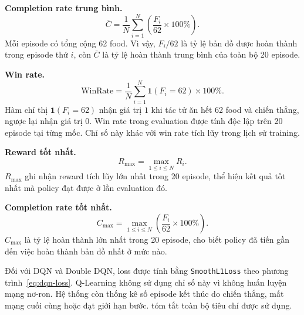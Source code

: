 \noindent\textbf{Completion rate trung bình.}
\begin{equation}
    \overline{C}=\frac{1}{N}\sum_{i=1}^{N}\left(\frac{F_i}{62}\times100\%\right).
    \label{eq:average-completion}
\end{equation}
Mỗi episode có tổng cộng 62 food. Vì vậy, $F_i/62$ là tỷ lệ bản đồ được hoàn thành trong episode thứ $i$, còn $\overline{C}$ là tỷ lệ hoàn thành trung bình của toàn bộ 20 episode.

\noindent\textbf{Win rate.}
\begin{equation}
    \mathrm{WinRate}=\frac{1}{N}\sum_{i=1}^{N}\mathbf{1}(F_i=62)\times100\%.
    \label{eq:evaluation-win-rate}
\end{equation}
Hàm chỉ thị $\mathbf{1}(F_i=62)$ nhận giá trị $1$ khi tác tử ăn hết 62 food và chiến thắng, ngược lại nhận giá trị $0$. Win rate trong evaluation được tính độc lập trên 20 episode tại từng mốc. Chỉ số này khác với win rate tích lũy trong lịch sử training.

\noindent\textbf{Reward tốt nhất.}
\begin{equation}
    R_{\max}=\max_{1\leq i\leq N}R_i.
    \label{eq:best-reward}
\end{equation}
$R_{\max}$ ghi nhận reward tích lũy lớn nhất trong 20 episode, thể hiện kết quả tốt nhất mà policy đạt được ở lần evaluation đó.

\noindent\textbf{Completion rate tốt nhất.}
\begin{equation}
    C_{\max}=\max_{1\leq i\leq N}\left(\frac{F_i}{62}\times100\%\right).
    \label{eq:best-completion}
\end{equation}
$C_{\max}$ là tỷ lệ hoàn thành lớn nhất trong 20 episode, cho biết policy đã tiến gần đến việc hoàn thành bản đồ nhất ở mức nào.

Đối với DQN và Double DQN, loss được tính bằng \texttt{SmoothL1Loss} theo phương trình~\eqref{eq:dqn-loss}. Q-Learning không sử dụng chỉ số này vì không huấn luyện mạng nơ-ron. Hệ thống còn thống kê số episode kết thúc do chiến thắng, mất mạng cuối cùng hoặc đạt giới hạn bước.  tóm tắt toàn bộ tiêu chí được sử dụng.

